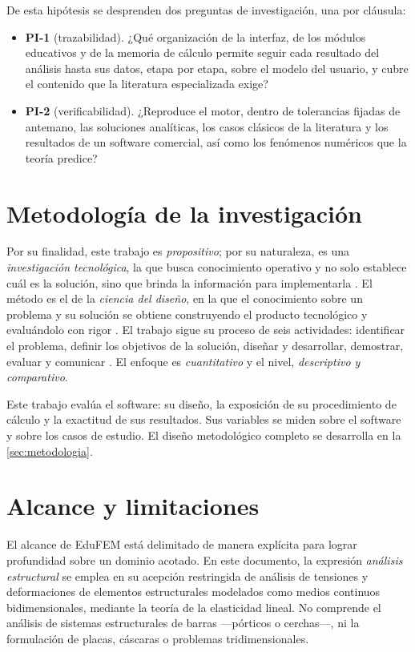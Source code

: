 De esta hipótesis se desprenden dos preguntas de investigación, una por cláusula:

\begin{itemize}
    \item \textbf{PI-1} (trazabilidad). ¿Qué organización de la interfaz, de los módulos educativos y de la memoria de cálculo permite seguir cada resultado del análisis hasta sus datos, etapa por etapa, sobre el modelo del usuario, y cubre el contenido que la literatura especializada exige?
    \item \textbf{PI-2} (verificabilidad). ¿Reproduce el motor, dentro de tolerancias fijadas de antemano, las soluciones analíticas, los casos clásicos de la literatura y los resultados de un software comercial, así como los fenómenos numéricos que la teoría predice?
\end{itemize}

\section*{Metodología de la investigación}

Por su finalidad, este trabajo es \emph{propositivo}; por su naturaleza, es una \emph{investigación tecnológica}, la que busca conocimiento operativo y no solo establece cuál es la solución, sino que brinda la información para implementarla \autocite[p.~91]{garciacordoba2005tecnologica}. El método es el de la \emph{ciencia del diseño}, en la que el conocimiento sobre un problema y su solución se obtiene construyendo el producto tecnológico y evaluándolo con rigor \autocite[p.~75]{hevner2004design}. El trabajo sigue su proceso de seis actividades: identificar el problema, definir los objetivos de la solución, diseñar y desarrollar, demostrar, evaluar y comunicar \autocite[pp.~52-56]{peffers2007dsrm}. El enfoque es \emph{cuantitativo} y el nivel, \emph{descriptivo y comparativo}.

Este trabajo evalúa el software: su diseño, la exposición de su procedimiento de cálculo y la exactitud de sus resultados. Sus variables se miden sobre el software y sobre los casos de estudio. El diseño metodológico completo se desarrolla en la \autoref{sec:metodologia}.

\section*{Alcance y limitaciones}

El alcance de EduFEM está delimitado de manera explícita para lograr profundidad sobre un dominio acotado. En este documento, la expresión \emph{análisis estructural} se emplea en su acepción restringida de análisis de tensiones y deformaciones de elementos estructurales modelados como medios continuos bidimensionales, mediante la teoría de la elasticidad lineal. No comprende el análisis de sistemas estructurales de barras —pórticos o cerchas—, ni la formulación de placas, cáscaras o problemas tridimensionales.

